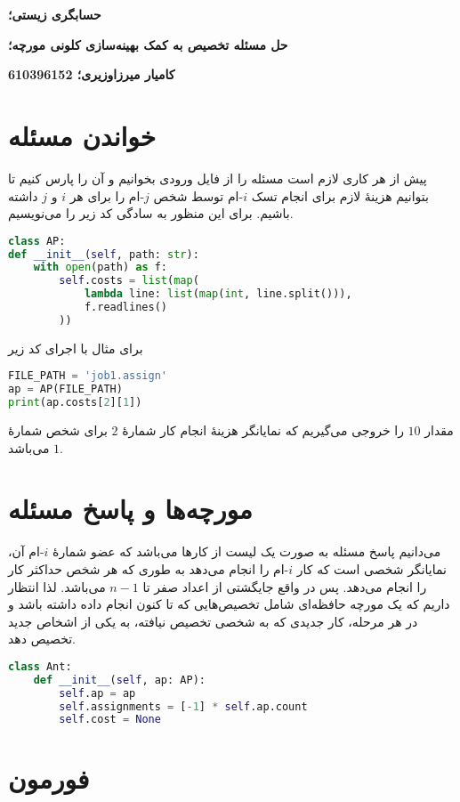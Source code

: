 \documentclass[a4paper, 12pt]{article}
\theoremstyle{definition}
\begin{document}
\textbf{حسابگری زیستی؛}

\textbf{حل مسئله تخصیص به کمک بهینه‌سازی کلونی مورچه؛}

\textbf{کامیار میرزاوزیری؛ 610396152}

\hrulefill

\section{خواندن مسئله}

پیش از هر کاری لازم است مسئله را از فایل ورودی بخوانیم و آن را پارس کنیم تا بتوانیم هزینهٔ لازم برای انجام تسک
$i$-ام
توسط شخص
$j$-ام
را برای هر
$i$
و
$j$
داشته باشیم. برای این منظور به سادگی کد زیر را می‌نویسیم.

\LTR
\begin{lstlisting}[language=Python]
class AP:
def __init__(self, path: str):
    with open(path) as f:
        self.costs = list(map(
            lambda line: list(map(int, line.split())),
            f.readlines()
        ))
\end{lstlisting}
\RTL

برای مثال با اجرای کد زیر

\LTR
\begin{lstlisting}[language=Python]
FILE_PATH = 'job1.assign'
ap = AP(FILE_PATH)
print(ap.costs[2][1])
\end{lstlisting}
\RTL

مقدار
$10$
را خروجی می‌گیریم که نمایانگر هزینهٔ انجام کار شمارهٔ
$2$
برای شخص شمارهٔ
$1$
می‌باشد.

\section{مورچه‌ها و پاسخ مسئله}

می‌دانیم پاسخ مسئله به صورت یک لیست از کارها می‌باشد که عضو شمارهٔ
$i$-ام
آن، نمایانگر شخصی است که کار
$i$-ام
را انجام می‌دهد به طوری که هر شخص حداکثر کار را انجام می‌دهد. پس در واقع جایگشتی از اعداد صفر تا
$n - 1$
می‌باشد. لذا انتظار داریم که یک مورچه حافظه‌ای شامل تخصیص‌هایی که تا کنون انجام داده داشته باشد و در هر مرحله، کار جدیدی که به شخصی تخصیص نیافته، به یکی از اشخاص جدید تخصیص دهد.

\LTR
\begin{lstlisting}[language=Python]
class Ant:
    def __init__(self, ap: AP):
        self.ap = ap
        self.assignments = [-1] * self.ap.count
        self.cost = None
\end{lstlisting}
\RTL

\section{فورمون}
\end{document}
